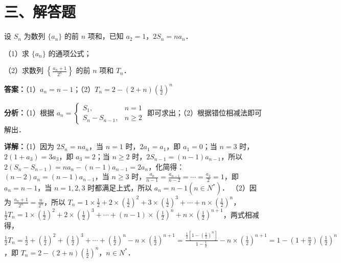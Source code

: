 \section*{三、解答题}

\begin{question}[points=12]
设 $S_n$ 为数列 $\{a_n\}$ 的前 $n$ 项和，已知 $a_2 = 1$，$2S_n = n a_n$．

（1）求 $\{a_n\}$ 的通项公式；

（2）求数列 $\left\{ \frac{a_n+1}{2^n} \right\}$ 的前 $n$ 项和 $T_n$．
\begin{solution}
\textbf{答案：}（1）$a_n = n-1$；（2）$T_n = 2 - (2+n)\left(\frac{1}{2}\right)^n$

\textbf{分析：}（1）根据 $a_n = \begin{cases} S_1, & n=1 \\ S_n-S_{n-1}, & n\ge 2 \end{cases}$ 即可求出；（2）根据错位相减法即可解出．

\textbf{详解：}（1）因为 $2S_n = n a_n$，当 $n=1$ 时，$2a_1 = a_1$，即 $a_1=0$；当 $n=3$ 时，$2(1+a_3)=3a_3$，即 $a_3=2$；当 $n\ge2$ 时，$2S_{n-1} = (n-1)a_{n-1}$，所以 $2(S_n-S_{n-1}) = n a_n - (n-1)a_{n-1} = 2a_n$，化简得：$(n-2)a_n = (n-1)a_{n-1}$，当 $n\ge3$ 时，$\frac{a_n}{n-1} = \frac{a_{n-1}}{n-2} = \cdots = \frac{a_3}{2} = 1$，即 $a_n = n-1$，当 $n=1,2,3$ 时都满足上式，所以 $a_n = n-1 (n\in N^*)$．
（2）因为 $\frac{a_n+1}{2^n} = \frac{n}{2^n}$，所以 $T_n = 1\times\frac{1}{2} + 2\times\left(\frac{1}{2}\right)^2 + 3\times\left(\frac{1}{2}\right)^3 + \cdots + n\times\left(\frac{1}{2}\right)^n$，$\frac{1}{2}T_n = 1\times\left(\frac{1}{2}\right)^2 + 2\times\left(\frac{1}{2}\right)^3 + \cdots + (n-1)\times\left(\frac{1}{2}\right)^n + n\times\left(\frac{1}{2}\right)^{n+1}$，两式相减得，$\frac{1}{2}T_n = \frac{1}{2} + \left(\frac{1}{2}\right)^2 + \left(\frac{1}{2}\right)^3 + \cdots + \left(\frac{1}{2}\right)^n - n\times\left(\frac{1}{2}\right)^{n+1} = \frac{\frac{1}{2}\left[1-\left(\frac{1}{2}\right)^n\right]}{1-\frac{1}{2}} - n\times\left(\frac{1}{2}\right)^{n+1} = 1 - \left(1+\frac{n}{2}\right)\left(\frac{1}{2}\right)^n$，即 $T_n = 2 - (2+n)\left(\frac{1}{2}\right)^n$，$n\in N^*$．
\end{solution}
\end{question}


